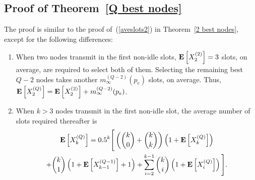 \documentclass[12pt,draftcls,peerreview, onecolumn]{IEEEtran}
\newcommand{\eqn}[1]{(\ref{#1})}
\newcommand{\expect}[1]{{\bf E}\left[{#1}\right]}
\newcommand{\EXQ}[2]{\expect{X_{#1}^{(#2)}}}
\newcommand{\aveslotsQ}[2]{m_{#1}^{(#2)}}
\begin{document}
\subsection{Proof of Theorem~\ref{Q best nodes}}
\label{proof of Q best nodes}
The proof is similar to the proof of~\eqn{aveslots2} in Theorem~\ref{2
  best nodes}, except for the following differences:
\begin{enumerate}

\item When two nodes transmit in the first non-idle slots,
  $\EXQ{2}{2}=3$ slots, on average, are required to select both of
  them.  Selecting the remaining best $Q-2$ nodes takes another
  $\aveslotsQ{\infty}{Q-2}(p_e)$ slots, on average.  Thus,
  $\EXQ{2}{Q}=\EXQ{2}{2}+\aveslotsQ{\infty}{Q-2}(p_e)$.

\item When $k>3$ nodes transmit in the first non-idle slot, the
  average number of slots required thereafter is
\begin{multline}
\EXQ{k}{Q}=0.5^k \Bigg[\left(\binom{k}{0}+\binom{k}{k}\right)\left(1+\EXQ{k}{Q}\right) \\
+ \binom{k}{1}\left(1+\EXQ{k-1}{Q-1}+1\right) +  \sum_{i=2}^{k-1} \binom{k}{i}\left(1+\EXQ{i}{Q}\right)\Bigg].
\end{multline}
\end{enumerate}




\end{document}

